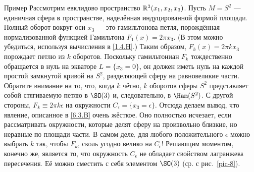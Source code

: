 \begin{ex}{Пример}\label{6.3.C}
Рассмотрим евклидово пространство $\mathbb{R}^3 (x_1, x_2, x_3)$.
Пусть $M = S^2$ — единичная сфера в пространстве, наделённая
индуцированной формой площади. 
Полный оборот вокруг оси $x_3$ — это гамильтонова петля, порождённая
нормализованной функцией Гамильтона $F_1 (x) = 2\pi x_3$. 
(В этом можно убедиться, используя вычисления в \ref{1.4.H}.)
Таким образом, $F_k (x) = 2\pi k x_3$ порождает петлю из $k$ оборотов.
Поскольку гамильтониан $F_k$ тождественно обращается в нуль на экваторе $L = \{x_3
= 0\}$, он должен иметь нуль на каждой простой
замкнутой кривой на $S^2$, разделяющей сферу на равновеликие части. 
Обратите внимание на то, что, когда $k$ чётно, $k$ оборотов сферы
$S^2$ представляет собой стягиваемую петлю в $\SO (3)$ и,
следовательно, в $\Ham (S^2)$. 
С другой стороны, $F_k \equiv 2\pi k\epsilon$ на окружности
$C_\epsilon = \{x_3 = \epsilon\}$. 
Отсюда делаем вывод, что явление, описанное в \ref{6.3.B} очень жёсткое.
Оно полностью исчезает, если рассматривать окружности, которые делят
сферу на произвольно близкие, но неравные по площади части. 
В самом деле, для любого положительного $\epsilon$ можно выбрать $k$ так,
чтобы $F_k$, сколь угодно велико на $C_\epsilon$!
Решающим моментом, конечно же, является то, что окружность
$C_\epsilon$ не обладает свойством лагранжева пересечения. 
Её можно сместить с себя элементом $\SO (3)$ (ср. с рис.~\ref{pic-8}). 
\end{ex}
